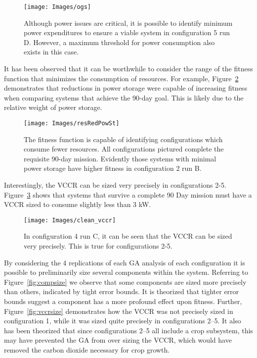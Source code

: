 \documentclass[submit]{aiaa}
\begin{document}
\begin{figure}[htb]
\texttt{[image: Images/ogs]}
\caption{Although power issues are critical, it is possible to
  identify minimum power expenditures to ensure a viable
  system in configuration 5 run D. However, a maximum threshold for
  power consumption also exists in this case.}
\label{fig:ogsminmax}
\end{figure}

It has been observed that it can be worthwhile to consider the range
of the fitness function that minimizes the consumption of
resources. 
For example, Figure~\ref{fig:resources} demonstrates that reductions in power storage were capable of increasing fitness when comparing systems that achieve the 90-day goal. 
This is likely due to the relative weight of power storage.

\begin{figure}[htb]
\texttt{[image: Images/resRedPowSt]}
\caption{The fitness function is capable of identifying configurations
which consume fewer resources. All configurations pictured complete
the requisite 90-day mission. Evidently those systems with minimal
power storage have higher fitness in configuration 2 run B.}
\label{fig:resources}
\end{figure}

Interestingly, the VCCR can be sized very precisely in configurations
2-5. Figure~\ref{fig:nicevccr} shows that systems that survive a complete 90
Day mission must have a VCCR sized to consume slightly less than 3 kW.

\begin{figure}[htb]
\texttt{[image: Images/clean\_vccr]}
\caption{In configuration 4 run C, it can be seen that the VCCR can be
sized very precisely. This is true for configurations 2-5.}
\label{fig:nicevccr}
\end{figure}

By considering the 4 replications of each GA analysis of each
configuration it is possible to preliminarily size several components
within the system. 
Referring to Figure~\ref{fig:compsize} we observe that some components
are sized more precisely than others, indicated by tight error
bounds. 
It is theorized that tighter error bounds
suggest a component has a more profound effect upon fitness. Further,
Figure~\ref{fig:vccrsize} demonstrates how the VCCR was not precisely
sized in configuration 1, while it was sized quite precisely in
configurations 2--5. It also has been theorized that since configurations
2--5 all include a crop subsystem, this may have prevented the GA from
over sizing the VCCR, which would have removed the carbon dioxide
necessary for crop growth.
\end{document}
